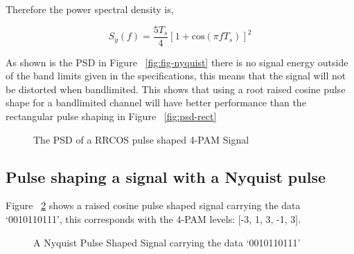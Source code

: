 Therefore the power spectral density is,

\begin{equation}
    \label{eqn:psd-nyquist}
    S_y(f) = \frac{5T_s}{4}[1+\textrm{cos}(\pi f T_s)]^2
\end{equation}

As shown is the PSD in Figure ~\ref{fig:fig-nyquist} there is no signal energy outside of the band limits
given in the specifications, this means that the signal will not be distorted when bandlimited. This shows
that using a root raised cosine pulse shape for a bandlimited channel will have better performance than
the rectangular pulse shaping in Figure ~\ref{fig:psd-rect}

\begin{figure}[h]
    \begin{center}
        
        \caption{The PSD of a RRCOS pulse shaped 4-PAM Signal}
        \label{fig:psd-nyquist}
    \end{center}
\end{figure}

\subsection{Pulse shaping a signal with a Nyquist pulse}

Figure ~\ref{fig:ny-pulse-shape} shows a raised cosine pulse shaped signal carrying the data `0010110111', this corresponds with the 4-PAM
levels: [-3, 1, 3, -1, 3].

\begin{figure}[H]
    \begin{center}
        
    \end{center}
    \label{fig:ny-pulse-shape}
    \caption{A Nyquist Pulse Shaped Signal carrying the data `0010110111'}
\end{figure}


    
